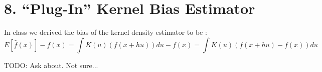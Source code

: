 \documentclass[10pt]{report}
\begin{document}
\section*{8. ``Plug-In'' Kernel Bias Estimator}
In class we derived the bias of the kernel density estimator to be :
\[E[\hat{f}(x)] - f(x) = \int K(u) (f(x+hu))du - f(x) =  \int K(u) (f(x+hu)-f(x))du\]

TODO: Ask about. Not sure...
\end{document}
